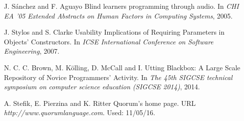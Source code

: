 \documentclass[preprint,10pt]{sigplanconf}
\begin{document}
\begin{thebibliography}{}
J. Sánchez and F. Aguayo \newblock Blind learners programming through audio. \newblock In \emph{CHI EA '05 Extended Abstracts on Human Factors in Computing Systems}, 2005.

J. Stylos and S. Clarke \newblock Usability Implications of Requiring Parameters in Objects' Constructors. \newblock In \emph{ICSE International Conference on Software Engineering}, 2007.

N. C. C. Brown, M. Kölling, D. McCall and I. Utting \newblock Blackbox: A Large Scale Repository of Novice Programmers’ Activity. \newblock In \emph{The 45th SIGCSE technical symposium on computer science education (SIGCSE 2014)}, 2014.

A. Stefik, E. Pierzina and K. Ritter \newblock Quorum's home page. \newblock URL \emph{http://www.quorumlanguage.com}. \newblock Used: 11/05/16.

\end{thebibliography}
\end{document}
